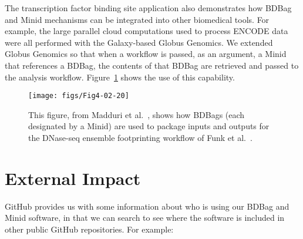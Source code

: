 \documentclass[11pt]{article}
\begin{document}
The transcription factor binding site application also demonstrates how BDBag and Minid mechanisms
can be integrated into other biomedical tools.
For example, the large parallel cloud computations used to process ENCODE data were all performed
with the Galaxy-based Globus Genomics.
We extended Globus Genomics so that when a workflow is passed, as an argument, a Minid 
that references a BDBag, 
the contents of that BDBag are retrieved and passed to the analysis workflow.
Figure~\ref{fig:5} shows the use of this capability.

\vspace{2ex}

\noindent{}


\begin{figure}
\centering
\texttt{[image: figs/Fig4-02-20]}
\caption{This figure, from Madduri et al.~\cite{madduri2018reproducible}, 
shows how BDBags (each designated by a Minid) are used to package inputs and outputs for the
 DNase-seq ensemble footprinting workflow of Funk et al.~\cite{funk18}.
\label{fig:5}}
\end{figure}


\section{External Impact}

GitHub provides us with some information about who is using our BDBag and Minid software,
in that we can search to see where the software is included in other public GitHub repositories. 
For example:
\end{document}
